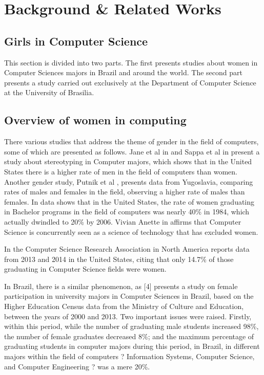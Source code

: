 \section{Background \& Related Works}\label{sec:background}%

\subsection{Girls in Computer Science}\label{subsec:background:girls}%
This section is divided into two parts. The first presents studies about women in Computer Sciences majors in Brazil and around the world. The second part presents a study carried out exclusively at the Department of Computer Science at the University of Brasilia.

\subsection{Overview of women in computing }
There various studies that address the theme of gender in the field of computers, some of which are presented as follows.
Jane et al in \cite{jane_2016} and Sappa et al in \cite{sappa_2013} present a study about stereotyping in Computer majors, which shows that in the United States there is a higher rate of men in the field of computers than women. Another gender study, Putnik et al  \cite{zoran_2017}, presents data from Yugoslavia, comparing rates of males and females in the field, observing a higher rate of males than females. In \cite{keinan_2017} \cite{moshe_2015} data shows that in the United States, the rate of women graduating in Bachelor programs in the field of computers was nearly 40\% in 1984, which actually dwindled to 20\% by 2006. Vivian Anette in \cite{vivian_2007} affirms that Computer Science is concurrently seen as a science of technology that has excluded women.

 In \cite{moshe_2015}  the Computer Science Research Association in North America reports data from 2013 and 2014 in the United States, citing that only 14.7\% of those graduating in Computer Science fields were women. 

In Brazil, there is a similar phenomenon, as [4] presents a study on female participation in university majors in Computer Sciences in Brazil, based on the Higher Education Census data from the Ministry of Culture and Education, between the years of 2000 and 2013. Two important issues were raised. Firstly, within this period, while the number of graduating male students increased 98\%, the number of female graduates decreased 8\%; and the maximum percentage of graduating students in computer majors during this period, in Brazil, in different majors within the field of computers ? Information Systems, Computer Science, and Computer Engineering ? was a mere 20\%.  


